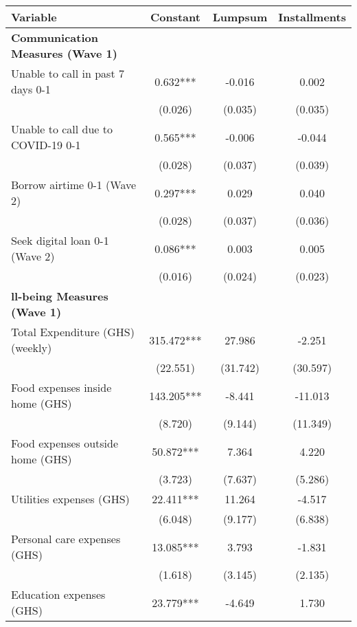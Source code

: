 \begin{tabular}{lccc}
\hline
 Variable & Constant & Lumpsum & Installments \\ [0.1em] 
\hline\hline
\textbf{Communication Measures (Wave 1)} & & & \\ 
 Unable to call in past 7 days 0-1 & 0.632*** & -0.016 & 0.002 \\ [0.1em] 
                   &      (0.026)     &      (0.035)     &      (0.035)     \\ [0.1em] 
 Unable to call due to COVID-19 0-1 & 0.565*** & -0.006 & -0.044 \\ [0.1em] 
                   &      (0.028)     &      (0.037)     &      (0.039)     \\ [0.1em] 
 Borrow airtime 0-1 (Wave 2) & 0.297*** & 0.029 & 0.040 \\ [0.1em] 
                   &      (0.028)     &      (0.037)     &      (0.036)     \\ [0.1em] 
 Seek digital loan 0-1 (Wave 2) & 0.086*** & 0.003 & 0.005 \\ [0.1em] 
                   &      (0.016)     &      (0.024)     &      (0.023)     \\ [0.1em] 
\textbf{ll-being Measures (Wave 1)} & & & \\ 
 Total Expenditure (GHS) (weekly) & 315.472*** & 27.986 & -2.251 \\ [0.1em] 
                   &      (22.551)     &      (31.742)     &      (30.597)     \\ [0.1em] 
 Food expenses inside home (GHS) & 143.205*** & -8.441 & -11.013 \\ [0.1em] 
                   &      (8.720)     &      (9.144)     &      (11.349)     \\ [0.1em] 
 Food expenses outside home (GHS) & 50.872*** & 7.364 & 4.220 \\ [0.1em] 
                   &      (3.723)     &      (7.637)     &      (5.286)     \\ [0.1em] 
 Utilities expenses (GHS) & 22.411*** & 11.264 & -4.517 \\ [0.1em] 
                   &      (6.048)     &      (9.177)     &      (6.838)     \\ [0.1em] 
 Personal care expenses (GHS) & 13.085*** & 3.793 & -1.831 \\ [0.1em] 
                   &      (1.618)     &      (3.145)     &      (2.135)     \\ [0.1em] 
 Education expenses (GHS) & 23.779*** & -4.649 & 1.730 \\ [0.1em] 

\end{tabular}
